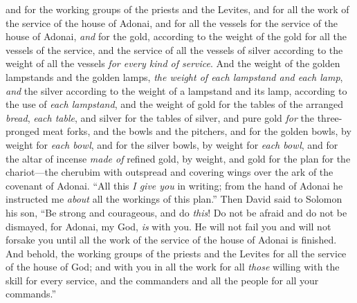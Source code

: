 \begin{biblechapter}
\verse and for the working groups of the priests and the Levites, and for all the work of the service of the house of Adonai, and for all the vessels for the service of the house of Adonai,
\verse \textit{and} for the gold, according to the weight of the gold for all the vessels of the service, and the service of all the vessels of silver according to the weight of all the vessels \textit{for every kind of service}.
\verse And the weight of the golden lampstands and the golden lamps, \textit{the weight of each lampstand and each lamp}, \textit{and} the silver according to the weight of a lampstand and its lamp, according to the use of \textit{each lampstand},
\verse and the weight of gold for the tables of the arranged \textit{bread}, \textit{each table}, and silver for the tables of silver,
\verse and pure gold \textit{for} the three-pronged meat forks, and the bowls and the pitchers, and for the golden bowls, by weight for \textit{each bowl}, and for the silver bowls, by weight for \textit{each bowl},
\verse and for the altar of incense \textit{made of} refined gold, by weight, and gold for the plan for the chariot—the cherubim with outspread and covering wings over the ark of the covenant of Adonai.
\verse “All this \textit{I give you} in writing; from the hand of Adonai he instructed me \textit{about} all the workings of this plan.”
\verse Then David said to Solomon his son, “Be strong and courageous, and do \textit{this}! Do not be afraid and do not be dismayed, for Adonai, my God, \textit{is} with you. He will not fail you and will not forsake you until all the work of the service of the house of Adonai is finished.
\verse And behold, the working groups of the priests and the Levites for all the service of the house of God; and with you in all the work for all \textit{those} willing with the skill for every service, and the commanders and all the people for all your commands.”
\end{biblechapter}

